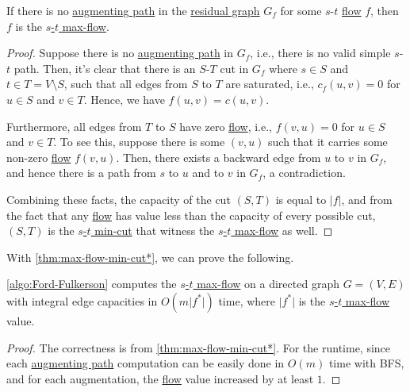 \begin{theorem}\label{thm:max-flow-min-cut*}
	If there is no \hyperref[def:augmenting-path]{augmenting path} in the \hyperref[def:residual-graph]{residual graph} \(G_f\) for some \(s\)-\(t\) \hyperref[def:flow]{flow} \(f\), then \(f\) is the \hyperref[prb:s-t-max-flow]{\(s\)-\(t\) max-flow}.
\end{theorem}
\begin{proof}
	Suppose there is no \hyperref[def:augmenting-path]{augmenting path} in \(G_f\), i.e., there is no valid simple \(s\)-\(t\) path. Then, it's clear that there is an \(S\)-\(T\) cut in \(G_f\) where \(s \in S\) and \(t \in T = V \setminus S\), such that all edges from \(S\) to \(T\) are saturated, i.e., \(c_f(u, v) = 0\) for \(u \in S\) and \(v \in T\). Hence, we have \(f(u, v) = c(u, v)\).

	Furthermore, all edges from \(T\) to \(S\) have zero \hyperref[def:flow]{flow}, i.e., \(f(v, u) = 0\) for \(u \in S\) and \(v \in T\). To see this, suppose there is some \((v, u)\) such that it carries some non-zero \hyperref[def:flow]{flow} \(f(v, u)\). Then, there exists a backward edge from \(u\) to \(v\) in \(G_f\), and hence there is a path from \(s\) to \(u\) and to \(v\) in \(G_f\), a contradiction.

	Combining these facts, the capacity of the cut \((S, T)\) is equal to \(\lvert f \rvert \), and from the fact that any \hyperref[def:flow]{flow} has value less than the capacity of every possible cut, \((S, T)\) is the \hyperref[prb:s-t-min-cut]{\(s\)-\(t\) min-cut} that witness the \hyperref[prb:s-t-max-flow]{\(s\)-\(t\) max-flow} as well.
\end{proof}

With \autoref{thm:max-flow-min-cut*}, we can prove the following.

\begin{theorem}\label{thm:Ford-Fulkerson}
	\autoref{algo:Ford-Fulkerson} computes the \hyperref[prb:s-t-max-flow]{\(s\)-\(t\) max-flow} on a directed graph \(G = (V, E)\) with integral edge capacities in \(O(m \lvert f^{\ast} \rvert)\) time, where \(\lvert f^{\ast} \rvert \) is the \hyperref[prb:s-t-max-flow]{\(s\)-\(t\) max-flow} value.
\end{theorem}
\begin{proof}
	The correctness is from \autoref{thm:max-flow-min-cut*}. For the runtime, since each \hyperref[def:augmenting-path]{augmenting path} computation can be easily done in \(O(m)\) time with BFS, and for each augmentation, the \hyperref[def:flow]{flow} value increased by at least \(1\).
\end{proof}

